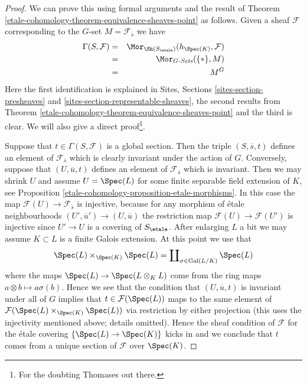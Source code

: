 \begin{proof}
We can prove this using formal arguments and the result of
Theorem \ref{etale-cohomology-theorem-equivalence-sheaves-point}
as follows. Given a sheaf $\mathcal{F}$ corresponding to
the $G$-set $M = \mathcal{F}_{\overline{s}}$ we have
\begin{eqnarray*}
\Gamma(S, \mathcal{F}) & = &
\Mor_{\Sh(S_\etale)}(h_{\Spec(K)},  \mathcal{F})
\\
& = & \Mor_{G\textit{-Sets}}(\{*\}, M) \\
& = & M^G
\end{eqnarray*}
Here the first identification is explained in
Sites, Sections \ref{sites-section-presheaves} and
\ref{sites-section-representable-sheaves},
the second results from
Theorem \ref{etale-cohomology-theorem-equivalence-sheaves-point}
and the third is clear. We will also give a direct proof\footnote{For
the doubting Thomases out there.}.

\medskip\noindent
Suppose that $t \in \Gamma(S, \mathcal{F})$ is a global section.
Then the triple $(S, \overline{s}, t)$ defines an element of
$\mathcal{F}_{\overline{s}}$ which is clearly invariant under the
action of $G$. Conversely, suppose that $(U, \overline{u}, t)$
defines an element of $\mathcal{F}_{\overline{s}}$ which is invariant.
Then we may shrink $U$ and assume $U = \Spec(L)$ for some
finite separable field extension of $K$, see
Proposition \ref{etale-cohomology-proposition-etale-morphisms}.
In this case the map $\mathcal{F}(U) \to \mathcal{F}_{\overline{s}}$
is injective, because for any morphism of \'etale neighbourhoods
$(U', \overline{u}') \to (U, \overline{u})$ the restriction map
$\mathcal{F}(U) \to \mathcal{F}(U')$ is injective since $U' \to U$
is a covering of $S_\etale$.
After enlarging $L$ a bit we may assume $K \subset L$ is a finite
Galois extension. At this point we use that
$$
\Spec(L) \times_{\Spec(K)} \Spec(L)
=
\coprod\nolimits_{\sigma \in \text{Gal}(L/K)} \Spec(L)
$$
where the maps $\Spec(L) \to \Spec(L \otimes_K L)$
come from the ring maps $a \otimes b \mapsto a\sigma(b)$. Hence we
see that the condition that $(U, \overline{u}, t)$ is invariant
under all of $G$ implies that $t \in \mathcal{F}(\Spec(L))$
maps to the same element of
$\mathcal{F}(\Spec(L) \times_{\Spec(K)} \Spec(L))$
via restriction by either projection (this uses the injectivity mentioned
above; details omitted). Hence the sheaf condition of $\mathcal{F}$
for the \'etale covering $\{\Spec(L) \to \Spec(K)\}$ kicks
in and we conclude that $t$ comes from a unique section of $\mathcal{F}$
over $\Spec(K)$.
\end{proof}

